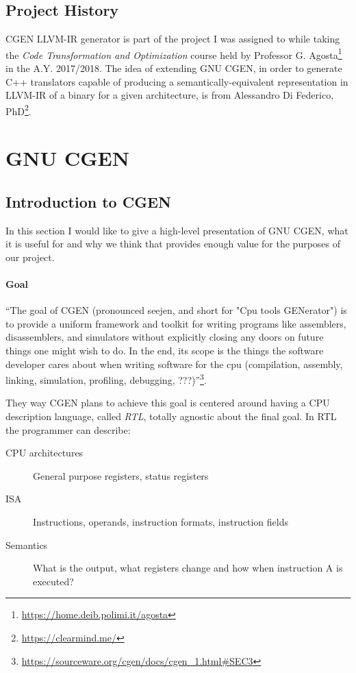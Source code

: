 \documentclass{article}
\begin{document}
\subsection{Project History}
CGEN LLVM-IR generator is part of the project I was assigned to while taking the \emph{Code Transformation and Optimization} course held by Professor G. Agosta\footnote{\url{https://home.deib.polimi.it/agosta}} in the A.Y. 2017/2018. The idea of extending GNU CGEN, in order to generate C++ translators capable of producing a semantically-equivalent representation in LLVM-IR of a binary for a given architecture, is from Alessandro Di Federico, PhD\footnote{\url{https://clearmind.me/}}. 

\clearpage
\section{GNU CGEN}
\subsection{Introduction to CGEN}
In this section I would like to give a high-level presentation of GNU CGEN, what it is useful for and why we think that provides enough value for the purposes of our project.
\paragraph{Goal}
``The goal of CGEN (pronounced seejen, and short for "Cpu tools GENerator") is to provide a uniform framework and toolkit for writing programs like assemblers, disassemblers, and simulators without explicitly closing any doors on future things one might wish to do. In the end, its scope is the things the software developer cares about when writing software for the cpu (compilation, assembly, linking, simulation, profiling, debugging, ???)''\footnote{\url{https://sourceware.org/cgen/docs/cgen_1.html\#SEC3}}.

They way CGEN plans to achieve this goal is centered around having a CPU description language, called \emph{RTL}, totally agnostic about the final goal. In RTL the programmer can describe:
\begin{description}
\item [CPU architectures] General purpose registers, status registers
\item [ISA] Instructions, operands, instruction formats, instruction fields
\item [Semantics] What is the output, what registers change and how when instruction A is executed?
\end{description}
\end{document}
